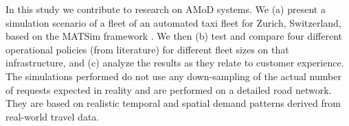 
In this study we contribute to research on AMoD systems. We
(a) present a simulation scenario of a fleet of an automated taxi fleet for Zurich, Switzerland,
based on the MATSim framework \citep{Horni2015}. We then (b) test and compare four different operational policies (from literature) for different fleet sizes on that infrastructure, and (c) analyze the results as they relate to 
 customer experience. The simulations performed do not use any down-sampling of the actual number of requests expected in reality and are performed on a detailed road network. They are based on realistic temporal and spatial demand patterns derived from real-world travel data.



